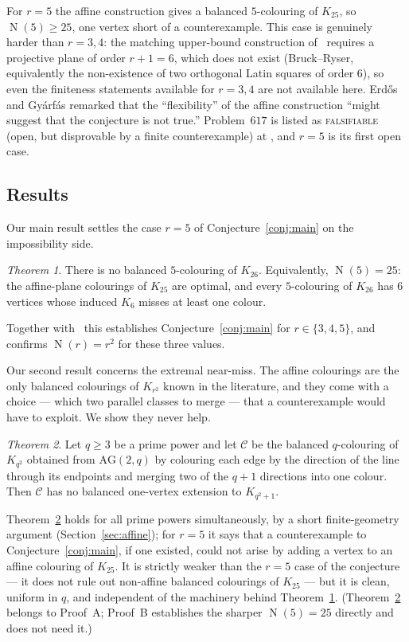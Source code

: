 \documentclass[11pt,reqno]{amsart}
\theoremstyle{definition}
\theoremstyle{remark}
\newtheorem{maintheorem}{Theorem}
\DeclareMathOperator{\Ncap}{N}
\begin{document}
For $r=5$ the affine construction gives a balanced $5$-colouring of $K_{25}$, so
$\Ncap(5)\ge 25$, one vertex short of a counterexample. This case is genuinely
harder than $r=3,4$: the matching upper-bound construction of~\cite{ErGy99}
requires a projective plane of order $r+1=6$, which does not exist
(Bruck--Ryser, equivalently the non-existence of two orthogonal Latin squares of
order $6$), so even the finiteness statements available for $r=3,4$ are not
available here. Erd\H{o}s and Gy\'arf\'as remarked that the ``flexibility'' of
the affine construction ``might suggest that the conjecture is not true.''
Problem~$617$ is listed as \textsc{falsifiable} (open, but disprovable by a finite
counterexample) at \cite{Bloom617}, and $r=5$ is its first open case.

\subsection{Results}
Our main result settles the case $r=5$ of Conjecture~\ref{conj:main} on the
impossibility side.

\begin{maintheorem}\label{thm:main}
There is no balanced $5$-colouring of $K_{26}$. Equivalently, $\Ncap(5)=25$: the
affine-plane colourings of $K_{25}$ are optimal, and every $5$-colouring of
$K_{26}$ has $6$ vertices whose induced $K_6$ misses at least one colour.
\end{maintheorem}

Together with~\cite{ErGy99} this establishes Conjecture~\ref{conj:main} for
$r\in\{3,4,5\}$, and confirms $\Ncap(r)=r^2$ for these three values.

Our second result concerns the extremal near-miss. The affine colourings are the
only balanced colourings of $K_{r^2}$ known in the literature, and they come with
a choice --- which two parallel classes to merge --- that a counterexample would
have to exploit. We show they never help.

\begin{maintheorem}\label{thm:affine}
Let $q\ge 3$ be a prime power and let $\mathcal C$ be the balanced $q$-colouring
of $K_{q^2}$ obtained from $\mathrm{AG}(2,q)$ by colouring each edge by the
direction of the line through its endpoints and merging two of the $q+1$
directions into one colour. Then $\mathcal C$ has no balanced one-vertex
extension to $K_{q^2+1}$.
\end{maintheorem}

Theorem~\ref{thm:affine} holds for all prime powers simultaneously, by a short
finite-geometry argument (Section~\ref{sec:affine}); for $r=5$ it says that a
counterexample to Conjecture~\ref{conj:main}, if one existed, could not arise by
adding a vertex to an affine colouring of $K_{25}$. It is strictly weaker than the
$r=5$ case of the conjecture --- it does not rule out non-affine balanced
colourings of $K_{25}$ --- but it is clean, uniform in $q$, and independent of the
machinery behind Theorem~\ref{thm:main}. (Theorem~\ref{thm:affine} belongs to
Proof~A; Proof~B establishes the sharper $\Ncap(5)=25$ directly and does not need it.)
\end{document}
